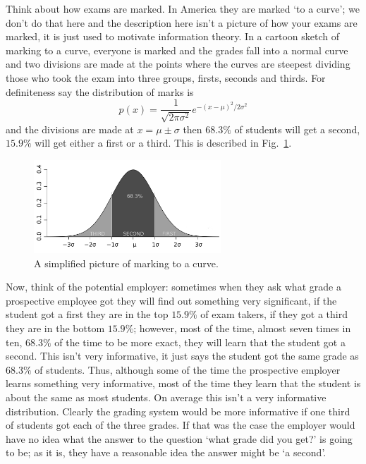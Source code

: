 \documentclass[12pt]{article}
\begin{document}
Think about how exams are marked. In America they are marked \lq{}to a
curve\rq{}; we don't do that here and the description here isn't a
picture of how your exams are marked, it is just used to motivate
information theory. In a cartoon sketch of marking to a curve,
everyone is marked and the grades fall into a normal curve and two
divisions are made at the points where the curves are steepest
dividing those who took the exam into three groups, firsts, seconds
and thirds. For definiteness say the distribution of marks is 
\begin{equation}
p(x)=\frac{1}{\sqrt{2\pi\sigma^2}}e^{-(x-\mu)^2/2\sigma^2}
\end{equation}
and the divisions are made at $x=\mu\pm\sigma$ then $68.3\%$ of
students will get a second, $15.9\%$ will get either a first or a
third. This is described in Fig.~\ref{fig_marking_to_a_curve}.

\begin{figure}
\begin{center}
\includegraphics[width=7cm]{marked_to_curve_gs.png}
\end{center}
\caption{A simplified picture of marking to a curve.\label{fig_marking_to_a_curve}}
\end{figure}

Now, think of the potential employer: sometimes when they ask what
grade a prospective employee got they will find out something very
significant, if the student got a first they are in the top $15.9\%$
of exam takers, if they got a third they are in the bottom $15.9\%$;
however, most of the time, almost seven times in ten, $68.3\%$ of the
time to be more exact, they will learn that the student got a
second. This isn't very informative, it just says the student got the
same grade as $68.3\%$ of students. Thus, although some of the time
the prospective employer learns something very informative, most of
the time they learn that the student is about the same as most
students. On average this isn't a very informative
distribution. Clearly the grading system would be more informative if
one third of students got each of the three grades. If that was the
case the employer would have no idea what the answer to the question
\lq{}what grade did you get?\rq{} is going to be; as it is, they have
a reasonable idea the answer might be \lq{}a second\rq{}.
\end{document}
